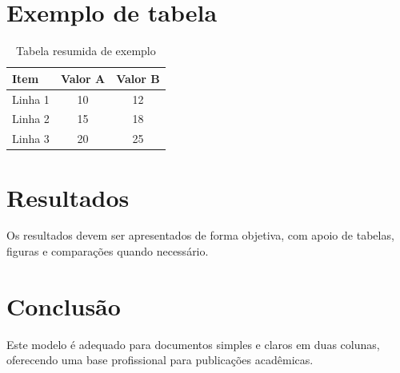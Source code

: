 \documentclass[10pt,a4paper,twocolumn]{article}
\begin{document}
\section{Exemplo de tabela}
\begin{table}[t]
\centering
\caption{Tabela resumida de exemplo}
\label{tab:exemplo}
\begin{tabular}{lcc}
\toprule
Item & Valor A & Valor B \\
\midrule
Linha 1 & 10 & 12 \\
Linha 2 & 15 & 18 \\
Linha 3 & 20 & 25 \\
\bottomrule
\end{tabular}
\end{table}

\section{Resultados}
Os resultados devem ser apresentados de forma objetiva, com apoio de tabelas, figuras e comparações quando necessário.

\section{Conclusão}
Este modelo é adequado para documentos simples e claros em duas colunas, oferecendo uma base profissional para publicações acadêmicas.
\end{document}
